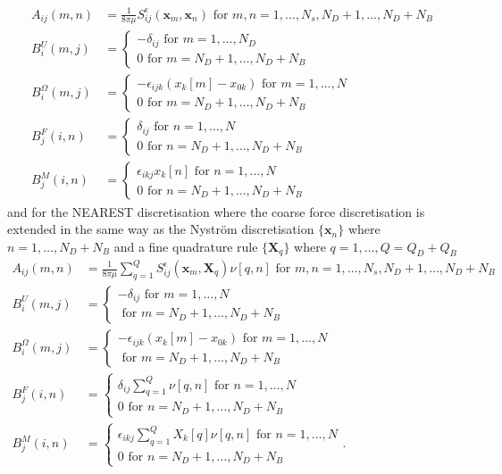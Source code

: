 \begin{equation*}
\begin{aligned}
A_{ij}(m,n) &= \frac{1}{8\pi\mu} S_{ij}^\epsilon (\bm{x}_m,\bm{x}_{n}) \text { for } m,n = 1,\dots,N_s,N_D+1,\dots,N_D+N_B \\
B_{i}^{U}(m,j) &= \begin{cases} -\delta_{ij} \text { for } m = 1,\dots,N_D \\ 0 \text { for } m = N_D+1,\dots,N_D+N_B\end{cases} \\
B_{i}^{\Omega}(m,j) &= \begin{cases} -\epsilon_{ijk}(x_k[m]-x_{0k}) \text { for } m = 1,\dots,N \\ 0 \text { for } m = N_D+1,\dots,N_D+N_B\end{cases} \\
B_{j}^{F}(i,n) &= \begin{cases} \delta_{ij} \text { for } n = 1,\dots,N \\ 0 \text { for } n = N_D+1,\dots,N_D+N_B\end{cases} \\
B_{j}^{M}(i,n) &= \begin{cases} \epsilon_{ikj} x_k[n] \text { for } n = 1,\dots,N \\ 0 \text { for } n = N_D+1,\dots,N_D+N_B\end{cases}
\end{aligned}
\end{equation*}
and for the NEAREST discretisation where the coarse force discretisation is extended in the same way as the Nyström discretisation $\{\bm{x}_n\}$ where $n=1,\dots,N_D+N_B$ and a fine quadrature rule $\{\bm{X}_q\}$ where $q=1,\dots,Q=Q_D+Q_B$
\begin{equation*}
\begin{aligned}
A_{ij}(m,n) &= \frac{1}{8\pi\mu} \sum_{q=1}^Q S_{ij}^\epsilon (\bm{x}_m,\bm{X}_{q})\nu[q,n] \text { for } m,n = 1,\dots,N_s,N_D+1,\dots,N_D+N_B  \\
B_{i}^{U}(m,j) &= \begin{cases} -\delta_{ij} \text { for } m = 1,\dots,N \\ \text { for } m = N_D+1,\dots,N_D+N_B\end{cases}\\
B_{i}^{\Omega}(m,j) &= \begin{cases} -\epsilon_{ijk}(x_k[m]-x_{0k}) \text { for } m = 1,\dots,N \\ \text { for } m = N_D+1,\dots,N_D+N_B\end{cases}\\
B_{j}^{F}(i,n) &= \begin{cases} \delta_{ij} \sum_{q=1}^Q \nu[q,n] \text { for } n = 1,\dots,N \\ 0 \text { for } n = N_D+1,\dots,N_D+N_B\end{cases} \\
B_{j}^{M}(i,n) &= \begin{cases} \epsilon_{ikj} \sum_{q=1}^Q X_k[q] \nu[q,n] \text { for } n = 1,\dots,N \\ 0 \text { for } n = N_D+1,\dots,N_D+N_B\end{cases}.
\end{aligned}
\end{equation*}

